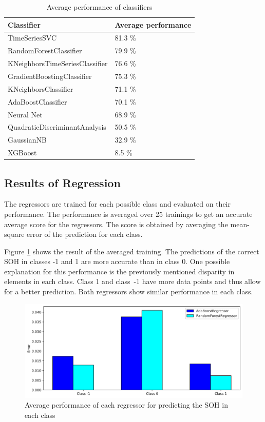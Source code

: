 \begin{table}
	\begin{center}
		\begin{tabular}{|| l | l ||}
			\hline
			\rule{0pt}{2ex}Classifier & Average performance\\
			\hline
			\hline
			\rule{0pt}{2ex}TimeSeriesSVC & 81.3 \%\\	\hline
			RandomForestClassifier & 79.9 \% \\ \hline
			KNeighborsTimeSeriesClassifier & 76.6 \%\\ \hline
			GradientBoostingClassifier & 75.3 \%\\ \hline
			KNeighborsClassifier & 71.1 \%\\ \hline
			AdaBoostClassifier & 70.1 \% \\ \hline
			Neural Net & 68.9 \% \\ \hline
			QuadraticDiscriminantAnalysis & 50.5 \% \\ \hline
			GaussianNB & 32.9 \% \\ \hline
			XGBoost & 8.5 \% \\ \hline

		\end{tabular}
		\caption{Average performance of classifiers}
		\label{score}
	\end{center}
	\vspace{-4mm}
\end{table}
\newpage
\subsection{Results of Regression}

The regressors are trained for each possible class and evaluated on their performance. The performance is averaged over 25 trainings to get an accurate average score for the regressors. The score is obtained by averaging the mean-square error of the prediction for each class.

Figure \ref{fig:avgperf_reg} shows the result of the averaged training. The predictions of the correct SOH in classes -1 and 1 are more accurate than in class 0. One possible explanation for this performance is the previously mentioned disparity in elements in each class. Class 1 and class~-1 have more data points and thus allow for a better prediction. Both regressors show similar performance in each class.

\begin{figure}[H]
	\centering
	\includegraphics[width=1\linewidth]{IMGs/Average_performance_REG.png}
	\caption{Average performance of each regressor for predicting the SOH in each class}
	\label{fig:avgperf_reg}
\end{figure}
